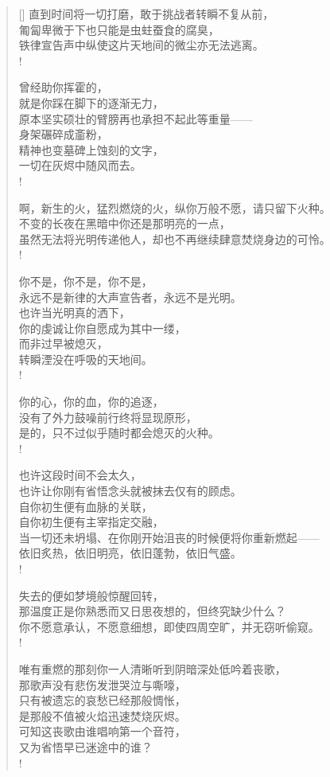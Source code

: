 \documentclass[UTF8, 12pt, a4paper]{ctexrep} %
\begin{document}
\begin{verse}[\versewidth]
直到时间将一切打磨，敢于挑战者转瞬不复从前，\\
匍匐卑微于下也只能是虫蛀蚕食的腐臭，\\
铁律宣告声中纵使这片天地间的微尘亦无法逃离。\\!

曾经助你挥霍的，\\
就是你踩在脚下的逐渐无力，\\
原本坚实硕壮的臂膀再也承担不起此等重量——\\
身架碾碎成齑粉，\\
精神也变墓碑上蚀刻的文字，\\
一切在灰烬中随风而去。\\!

啊，新生的火，猛烈燃烧的火，纵你万般不愿，请只留下火种。\\
不变的长夜在黑暗中你还是那明亮的一点，\\
虽然无法将光明传递他人，却也不再继续肆意焚烧身边的可怜。\\!

你不是，你不是，你不是，\\
永远不是新律的大声宣告者，永远不是光明。\\
也许当光明真的洒下，\\
你的虔诚让你自愿成为其中一缕，\\
而非过早被熄灭，\\
转瞬湮没在呼吸的天地间。\\!

你的心，你的血，你的追逐，\\
没有了外力鼓噪前行终将显现原形，\\
是的，只不过似乎随时都会熄灭的火种。\\!

也许这段时间不会太久，\\
也许让你刚有省悟念头就被抹去仅有的顾虑。\\
自你初生便有血脉的关联，\\
自你初生便有主宰指定交融，\\
当一切还未坍塌、在你刚开始沮丧的时候便将你重新燃起——\\
依旧炙热，依旧明亮，依旧蓬勃，依旧气盛。\\!

失去的便如梦境般惊醒回转，\\
那温度正是你熟悉而又日思夜想的，但终究缺少什么？\\
你不愿意承认，不愿意细想，即使四周空旷，并无窃听偷窥。\\!

唯有重燃的那刻你一人清晰听到阴暗深处低吟着丧歌，\\
那歌声没有悲伤发泄哭泣与嘶嚎，\\
只有被遗忘的哀愁已经那般惆怅，\\
是那般不值被火焰迅速焚烧灰烬。\\
可知这丧歌由谁唱响第一个音符，\\
又为省悟早已迷途中的谁？\\!


\end{verse}
\end{document}
